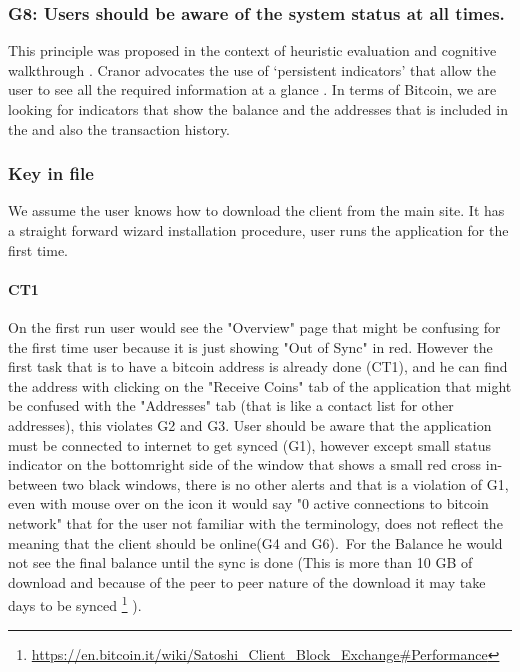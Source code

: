 \subsubsection*{G8: Users should be aware of the system status at all times.} This principle was proposed in the context of heuristic evaluation \cite{cw} and cognitive walkthrough \cite{pvo}. Cranor advocates the use of `persistent indicators' that allow the user to see all the required information at a glance \cite{p3p}. In terms of Bitcoin, we are looking for indicators that show the balance and the addresses that is included in the \walletfile and also the transaction history.

\subsubsection{Key in file}
We assume the user knows how to download the client from the main site. It has a straight forward wizard installation procedure, user runs the application for the first time. %


 \paragraph{CT1}  On the first run user would see the "Overview" page that might be confusing for the first time user because it is just showing "Out of Sync" in red. However the first task that is to have a bitcoin address is already done (CT1), and he can find the address with clicking on the "Receive Coins" tab of the application that might be confused with the "Addresses" tab (that is like a contact list for other addresses), this violates G2 and G3.
User should be aware that the application must be connected to internet to get synced (G1), however except small status indicator on the bottomright side of the window that shows a small red cross in-between two black windows, there is no other alerts and that is a violation of G1, even with mouse over on the icon it would say "0 active connections to bitcoin network" that for the user not familiar with the terminology, does not reflect the meaning that the client should be online(G4 and G6).\ 
For the Balance he would not see the final balance until the sync is done (This is more than 10 GB of download and because of the peer to peer nature of the download it may take days to be synced \footnote {\url { https://en.bitcoin.it/wiki/Satoshi_Client_Block_Exchange\#Performance}} ).
